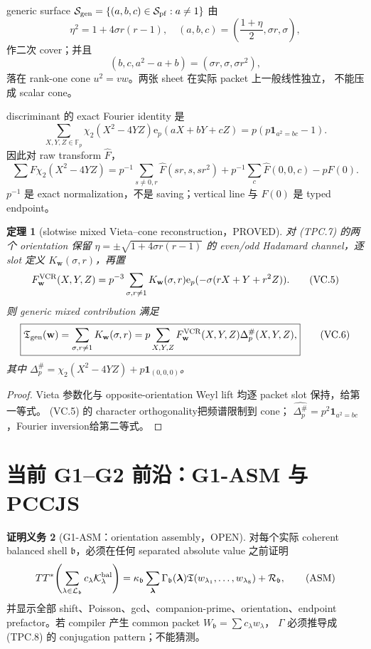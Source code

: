 \documentclass[11pt,a4paper]{ctexart}
\newtheorem{theorem}{定理}[section]
\theoremstyle{definition}
\newtheorem{obligation}[theorem]{证明义务}
\newcommand{\e}{\mathrm e}
\newcommand{\1}{\mathbf 1}
\newcommand{\F}{\mathbb F}
\newcommand{\PROVED}{\textcolor{green!40!black}{\textsf{PROVED}}}
\newcommand{\OPEN}{\textcolor{red!70!black}{\textsf{OPEN}}}
\begin{document}
generic surface $\mathcal S_{\rm gen}=\{(a,b,c)\in\mathcal S_{\rm pf}:a\ne1\}$
由
\[
 \eta^2=1+4\sigma r(r-1),\quad
 (a,b,c)=\left(\frac{1+\eta}{2},\sigma r,\sigma\right),             \tag{VC.1}
\]
作二次 cover；并且
\[
 (b,c,a^2-a+b)=(\sigma r,\sigma,\sigma r^2),         \tag{VC.2}
\]
落在 rank-one cone $u^2=vw$。两张 sheet 在实际 packet 上一般线性独立，
不能压成 scalar cone。

discriminant 的 exact Fourier identity 是
\[
 \sum_{X,Y,Z\in\F_p}\chi_2(X^2-4YZ)\e_p(aX+bY+cZ)
 =p(p\1_{a^2=bc}-1).                                 \tag{VC.3}
\]
因此对 raw transform $\widehat F$，
\[
 \sum F\chi_2(X^2-4YZ)
 =p^{-1}\sum_{s\ne0,r}\widehat F(sr,s,sr^2)
 +p^{-1}\sum_c\widehat F(0,0,c)-pF(0).              \tag{VC.4}
\]
$p^{-1}$ 是 exact normalization，不是 saving；vertical line 与 $F(0)$ 是 typed
endpoint。

\begin{theorem}[slotwise mixed Vieta--cone reconstruction，\PROVED]
对 (TPC.7) 的两个 orientation 保留 $\eta=\pm\sqrt{1+4\sigma r(r-1)}$ 的
even/odd Hadamard channel，逐 slot 定义 $K_{\mathbf w}(\sigma,r)$，再置
\[
 F_{\mathbf w}^{\rm VCR}(X,Y,Z)=p^{-3}\sum_{\sigma,r\ne1}
 K_{\mathbf w}(\sigma,r)\e_p(-\sigma(rX+Y+r^2Z)).   \tag{VC.5}
\]
则 generic mixed contribution 满足
\[
 \boxed{\mathfrak T_{\rm gen}(\mathbf w)
 =\sum_{\sigma,r\ne1}K_{\mathbf w}(\sigma,r)
 =p\sum_{X,Y,Z}F_{\mathbf w}^{\rm VCR}(X,Y,Z)
 \Delta_p^\#(X,Y,Z),}                               \tag{VC.6}
\]
其中
$\Delta_p^\#=\chi_2(X^2-4YZ)+p\1_{(0,0,0)}$。
\end{theorem}
\begin{proof}
Vieta 参数化与 opposite-orientation Weyl lift 均逐 packet slot 保持，给第一等式。
(VC.5) 的 character orthogonality把频谱限制到 cone；
$\widehat{\Delta_p^\#}=p^2\1_{a^2=bc}$，Fourier inversion给第二等式。
\end{proof}

\section{当前 G1--G2 前沿：G1-ASM 与 PCCJS}
\label{sec:frontier}

\begin{obligation}[G1-ASM：orientation assembly，\OPEN]
对每个实际 coherent balanced shell $\mathfrak b$，必须在任何 separated absolute
value 之前证明
\[
 TT^*\!\left(\sum_{\lambda\in\mathcal L_{\mathfrak b}}
 c_\lambda\mathcal K_\lambda^{\rm bal}\right)
 =\kappa_{\mathfrak b}\sum_{\boldsymbol\lambda}
 \Gamma_{\mathfrak b}(\boldsymbol\lambda)
 \mathfrak T(w_{\lambda_1},\ldots,w_{\lambda_8})
 +\mathcal R_{\mathfrak b},                         \tag{ASM}
\]
并显示全部 shift、Poisson、gcd、companion-prime、orientation、endpoint
prefactor。若 compiler 产生 common packet $W_{\mathfrak b}=\sum c_\lambda w_\lambda$，
$\Gamma$ 必须推导成 (TPC.8) 的 conjugation pattern；不能猜测。
\end{obligation}
\end{document}

